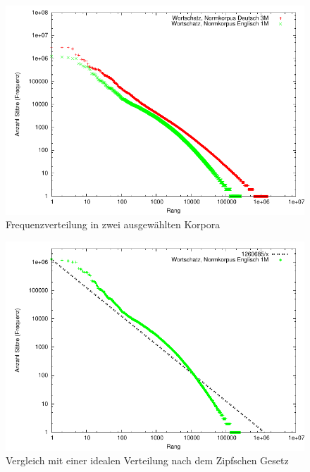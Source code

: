 \begin{figure}[htb]
\includegraphics[width=1\textwidth]{img/pdf/zipf_wortschatz_reduced.pdf}
\caption[]{Frequenzverteilung in zwei ausgewählten Korpora}
\label{fig:zipf_wortschatz}
\end{figure}

\begin{figure}[htb]
\includegraphics[width=1\textwidth]{img/pdf/zipf_wortschatz_with_expected_values_reduced.pdf}
\caption[]{Vergleich mit einer idealen Verteilung nach dem Zipfschen Gesetz}%
\label{fig:zipf_wortschatz_with_expected_values}
\end{figure}

